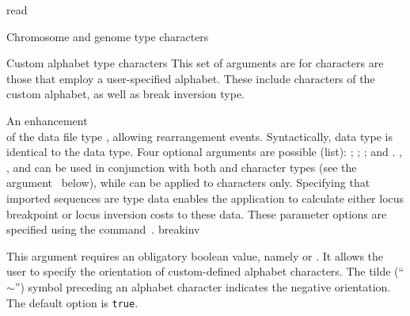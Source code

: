 \begin{command}{read}{}
\begin{arguments}
\begin{argumentgroup}{Chromosome and genome type characters}
        \end{argumentgroup}
   
   
        \begin{argumentgroup}{Custom alphabet type characters}
            This set of arguments are for characters are those that employ a
            user-specified alphabet. These include characters of the custom
            alphabet, as well as break inversion type.
    
                {An enhancement \\ of the data file type , allowing
                rearrangement events. Syntactically,  data type is identical to the
                 data type.  Four optional arguments are possible (\poylident list): 
                ;  ;  ;  and  .
                , , and  can be used in conjunction
                with both  and  character types (see the argument~ below), 
                while  can be applied to  characters only.
                Specifying that imported sequences are  type data enables
                the application to calculate  either locus breakpoint or locus inversion costs to these data.  These parameter
                options are specified using the command~.} 
                {breakinv}
           
            \begin{description}
                    {This argument requires an obligatory boolean value, namely
                     or .  It allows the user
                    to specify the orientation of custom-defined alphabet
                    characters. The tilde (``$\sim$'') symbol preceding an
                    alphabet character indicates the negative orientation. The
                    default option is \texttt{true}. }
                    {}
            \end{description}
      

\end{argumentgroup}
\end{arguments}
\end{command}
